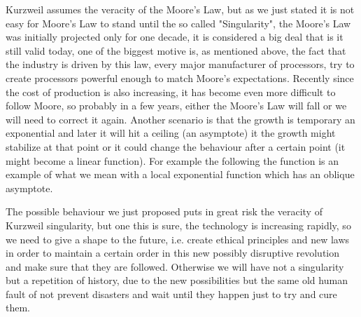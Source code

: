 \documentclass[12pt, a4page]{article}
\begin{document}
Kurzweil assumes the veracity of the Moore's Law, but as we just stated it is not easy for Moore's Law to stand until the so called "Singularity", the Moore's Law was initially projected only for one decade, it is considered a big deal that is it still valid today, one of the biggest motive is, as mentioned above, the fact that the industry is driven by this law, every major manufacturer of processors, try to create processors powerful enough to match Moore's expectations. Recently since the cost of production is also increasing, it has become even more difficult to follow Moore, so probably in a few years, either the Moore's Law will fall or we will need to correct it again. Another scenario is that the growth is temporary an exponential and later it will hit a ceiling (an asymptote) it the growth might stabilize at that point or it could change the behaviour after a certain point (it might become a linear function). For example the following the function is an example of what we mean with a local exponential function which has an oblique asymptote.
\newline
{}
\newline
The possible behaviour we just proposed puts in great risk the veracity of Kurzweil singularity, but one this is sure, the technology is increasing rapidly, so we need to give a shape to the future, i.e. create ethical principles and new laws in order to maintain a certain order in this new possibly disruptive revolution and make sure that they are followed. Otherwise we will have not a singularity but a repetition of history, due to the new possibilities but the same old human fault of not prevent disasters and wait until they happen just to try and cure them.
\newpage
\printbibliography
\end{document}
